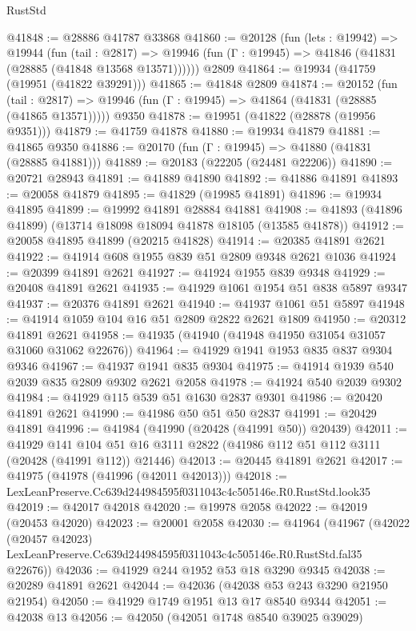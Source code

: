 \begin{lexlean}{RustStd}
\begin{coremodule}
@41848 := @28886 @41787 @33868
@41860 := @20128
    (fun (lets : @19942) =>
    @19944
      (fun (tail : @2817) =>
      @19946 (fun (Γ : @19945) => @41846 (@41831 (@28885 (@41848 @13568 @13571))))))
    @2809
@41864 := @19934 (@41759 (@19951 (@41822 @39291)))
@41865 := @41848 @2809
@41874 := @20152
    (fun (tail : @2817) => @19946 (fun (Γ : @19945) => @41864 (@41831 (@28885 (@41865 @13571)))))
    @9350
@41878 := @19951 (@41822 (@28878 (@19956 @9351)))
@41879 := @41759 @41878
@41880 := @19934 @41879
@41881 := @41865 @9350
@41886 := @20170 (fun (Γ : @19945) => @41880 (@41831 (@28885 @41881)))
@41889 := @20183 (@22205 (@24481 @22206))
@41890 := @20721 @28943
@41891 := @41889 @41890
@41892 := @41886 @41891
@41893 := @20058 @41879
@41895 := @41829 (@19985 @41891)
@41896 := @19934 @41895
@41899 := @19992 @41891 @28884 @41881
@41908 := @41893 (@41896 @41899) (@13714 @18098 @18094 @41878 @18105 (@13585 @41878))
@41912 := @20058 @41895 @41899 (@20215 @41828)
@41914 := @20385 @41891 @2621
@41922 := @41914 @608 @1955 @839 @51 @2809 @9348 @2621 @1036
@41924 := @20399 @41891 @2621
@41927 := @41924 @1955 @839 @9348
@41929 := @20408 @41891 @2621
@41935 := @41929 @1061 @1954 @51 @838 @5897 @9347
@41937 := @20376 @41891 @2621
@41940 := @41937 @1061 @51 @5897
@41948 := @41914 @1059 @104 @16 @51 @2809 @2822 @2621 @1809
@41950 := @20312 @41891 @2621
@41958 := @41935 (@41940 (@41948 @41950 @31054 @31057 @31060 @31062 @22676))
@41964 := @41929 @1941 @1953 @835 @837 @9304 @9346
@41967 := @41937 @1941 @835 @9304
@41975 := @41914 @1939 @540 @2039 @835 @2809 @9302 @2621 @2058
@41978 := @41924 @540 @2039 @9302
@41984 := @41929 @115 @539 @51 @1630 @2837 @9301
@41986 := @20420 @41891 @2621
@41990 := @41986 @50 @51 @50 @2837
@41991 := @20429 @41891
@41996 := @41984 (@41990 (@20428 (@41991 @50)) @20439)
@42011 := @41929
    @141
    @104
    @51
    @16
    @3111
    @2822
    (@41986 @112 @51 @112 @3111 (@20428 (@41991 @112)) @21446)
@42013 := @20445 @41891 @2621
@42017 := @41975 (@41978 (@41996 (@42011 @42013)))
@42018 := LexLeanPreserve.Cc639d244984595f0311043c4c505146e.R0.RustStd.look35
@42019 := @42017 @42018
@42020 := @19978 @2058
@42022 := @42019 (@20453 @42020)
@42023 := @20001 @2058
@42030 := @41964
    (@41967
      (@42022
        (@20457 @42023)
        LexLeanPreserve.Cc639d244984595f0311043c4c505146e.R0.RustStd.fal35
        @22676))
@42036 := @41929 @244 @1952 @53 @18 @3290 @9345
@42038 := @20289 @41891 @2621
@42044 := @42036 (@42038 @53 @243 @3290 @21950 @21954)
@42050 := @41929 @1749 @1951 @13 @17 @8540 @9344
@42051 := @42038 @13
@42056 := @42050 (@42051 @1748 @8540 @39025 @39029)

\end{coremodule}
\end{lexlean}
